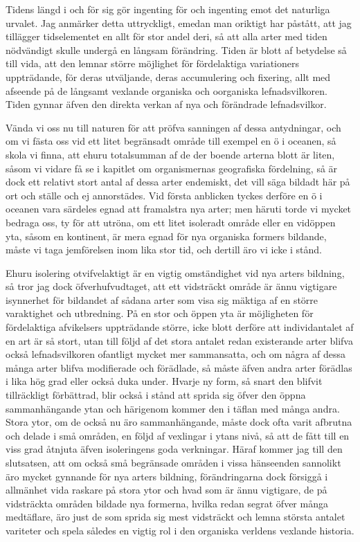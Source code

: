 Tidens längd i och för sig gör ingenting för och ingenting emot det naturliga urvalet. Jag anmärker detta uttryckligt, emedan man oriktigt har påstått, att jag tillägger tidselementet en allt för stor andel deri, så att alla arter med tiden nödvändigt skulle undergå en långsam förändring. Tiden är blott af betydelse så till vida, att den lemnar större möjlighet för fördelaktiga variationers uppträdande, för deras utväljande, deras accumulering och fixering, allt med afseende på de långsamt vexlande organiska och oorganiska lefnadsvilkoren. Tiden gynnar äfven den direkta verkan af nya och förändrade lefnadsvilkor.

Vända vi oss nu till naturen för att pröfva sanningen af dessa antydningar, och om vi fästa oss vid ett litet begränsadt område till exempel en ö i oceanen, så skola vi finna, att ehuru totalsumman af de der boende arterna blott är liten, såsom vi vidare få se i kapitlet om organismernas geografiska fördelning, så är dock ett relativt stort antal af dessa arter endemiskt, det vill säga bildadt här på ort och ställe och ej annorstädes. Vid första anblicken tyckes derföre en ö i oceanen vara särdeles egnad att framalstra nya arter; men häruti torde vi mycket bedraga oss, ty för att utröna, om ett litet isoleradt område eller en vidöppen yta, såsom en kontinent, är mera egnad för nya organiska formers bildande, måste vi taga jemförelsen inom lika stor tid, och dertill äro vi icke i stånd.

Ehuru isolering otvifvelaktigt är en vigtig omständighet vid nya arters bildning, så tror jag dock öfverhufvudtaget, att ett vidsträckt område är ännu vigtigare isynnerhet för bildandet af sådana arter som visa sig mäktiga af en större varaktighet och utbredning. På en stor och öppen yta är möjligheten för fördelaktiga afvikelsers uppträdande större, icke blott derföre att individantalet af en art är så stort, utan till följd af det stora antalet redan existerande arter blifva också lefnadsvilkoren ofantligt mycket mer sammansatta, och om några af dessa många arter blifva modifierade och förädlade, så måste äfven andra arter förädlas i lika hög grad eller också duka under. Hvarje ny form, så snart den blifvit tillräckligt förbättrad, blir också i stånd att sprida sig öfver den öppna sammanhängande ytan och härigenom kommer den i täflan med många andra. Stora ytor, om de också nu äro sammanhängande, måste dock ofta varit afbrutna och delade i små områden, en följd af vexlingar i ytans nivå, så att de fått till en viss grad åtnjuta äfven isoleringens goda verkningar. Häraf kommer jag till den slutsatsen, att om också små begränsade områden i vissa hänseenden sannolikt äro mycket gynnande för nya arters bildning, förändringarna dock försiggå i allmänhet vida raskare på stora ytor och hvad som är ännu vigtigare, de på vidsträckta områden bildade nya formerna, hvilka redan segrat öfver många medtäflare, äro just de som sprida sig mest vidsträckt och lemna största antalet variteter och spela således en vigtig rol i den organiska verldens vexlande historia.

